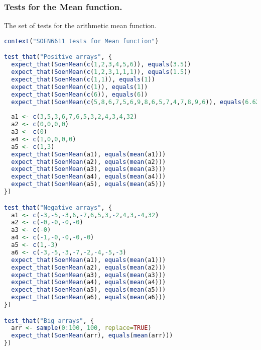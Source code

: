 \documentclass[12pt]{article}
\begin{document}
\subsubsection{Tests for the Mean function.}
The set of tests for the arithmetic mean function.
\begin{lstlisting}[language=R]
context("SOEN6611 tests for Mean function")

test_that("Positive arrays", {
  expect_that(SoenMean(c(1,2,3,4,5,6)), equals(3.5))
  expect_that(SoenMean(c(1,2,3,1,1,1)), equals(1.5))
  expect_that(SoenMean(c(1,1)), equals(1))
  expect_that(SoenMean(c(1)), equals(1))
  expect_that(SoenMean(c(6)), equals(6))
  expect_that(SoenMean(c(5,8,6,7,5,6,9,8,6,5,7,4,7,8,9,6)), equals(6.625))
  
  a1 <- c(3,5,3,6,7,6,5,3,2,4,3,4,32)
  a2 <- c(0,0,0,0)
  a3 <- c(0)
  a4 <- c(1,0,0,0,0)
  a5 <- c(1,3)
  expect_that(SoenMean(a1), equals(mean(a1)))
  expect_that(SoenMean(a2), equals(mean(a2)))
  expect_that(SoenMean(a3), equals(mean(a3)))
  expect_that(SoenMean(a4), equals(mean(a4)))
  expect_that(SoenMean(a5), equals(mean(a5)))
})

test_that("Negative arrays", {
  a1 <- c(-3,-5,-3,6,-7,6,5,3,-2,4,3,-4,32)
  a2 <- c(-0,-0,-0,-0)
  a3 <- c(-0)
  a4 <- c(-1,-0,-0,-0,-0)
  a5 <- c(1,-3)
  a6 <- c(-3,-5,-3,-7,-2,-4,-5,-3)
  expect_that(SoenMean(a1), equals(mean(a1)))
  expect_that(SoenMean(a2), equals(mean(a2)))
  expect_that(SoenMean(a3), equals(mean(a3)))
  expect_that(SoenMean(a4), equals(mean(a4)))
  expect_that(SoenMean(a5), equals(mean(a5)))
  expect_that(SoenMean(a6), equals(mean(a6)))
})

test_that("Big arrays", {
  arr <- sample(0:100, 100, replace=TRUE)
  expect_that(SoenMean(arr), equals(mean(arr)))
})
\end{lstlisting}
\end{document}
